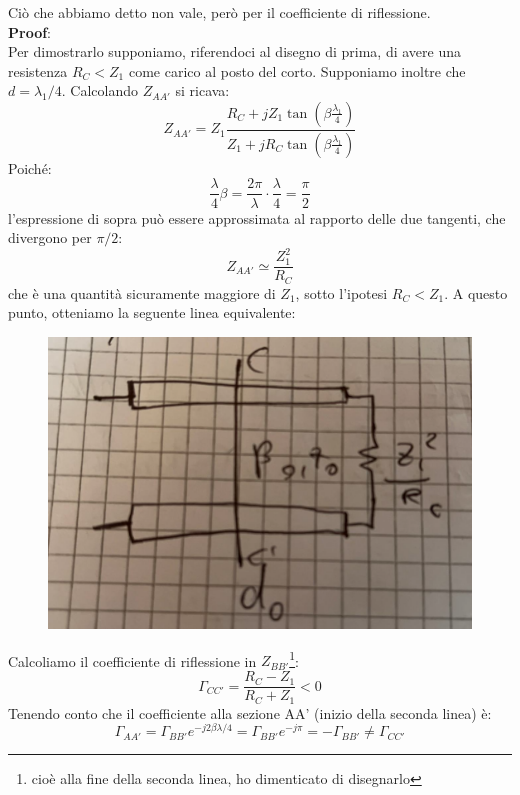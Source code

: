 \documentclass{book}
\begin{document}
    Ciò che abbiamo detto non vale, però per il coefficiente di riflessione.  \\
    \textbf{Proof}: \\
    Per dimostrarlo supponiamo, riferendoci al disegno 
    di prima, di avere una resistenza $R_{C}<Z_{1}$ come carico al posto del corto. Supponiamo inoltre che $d=\lambda_{1} /4$. Calcolando $Z_{AA'}$ si ricava:
    \begin{equation}
        Z_{AA'} = Z_{1}\frac{R_{C}+jZ_{1}\tan(\beta \frac{\lambda_{1}}{4})}{Z_{1}+jR_{C}\tan(\beta \frac{\lambda_{1}}{4})}
    \end{equation}
    Poiché:
    \begin{equation}
        \frac{\lambda}{4}\beta = \frac{2\pi}{\lambda} \cdot \frac{\lambda}{4}=\frac{\pi}{2}
    \end{equation}
    l'espressione di sopra può essere approssimata al rapporto delle due tangenti, che divergono per $\pi/2$:
    \begin{equation}
        Z_{AA'} \simeq \frac{Z_{1} ^{2}}{R_{C}}
    \end{equation}
    che è una quantità sicuramente maggiore di $Z_{1}$, sotto l'ipotesi $R_{C}<Z_{1}$.
    A questo punto, otteniamo la seguente linea equivalente:
    \begin{figure}[h!]
        \center  
        \includegraphics[width=0.6\linewidth]{Chapter_two/Chapt2img16.png}
    \end{figure}
    Calcoliamo il coefficiente di riflessione in $Z_{BB'}$\footnote{cioè alla fine della seconda linea, ho dimenticato di disegnarlo}:
        \begin{equation}
            \Gamma_{CC'} = \frac{R_{C}-Z_{1}}{R_{C}+Z_{1}} < 0
        \end{equation}
    Tenendo conto che il coefficiente alla sezione AA' (inizio della seconda linea) è:
    \begin{equation}
        \Gamma_{AA'} = \Gamma_{BB'}e^{-j 2 \beta \lambda/4} = \Gamma_{BB'}e^{-j \pi} = -\Gamma_{BB'} \neq \Gamma_{CC'}
    \end{equation}
\end{document}

